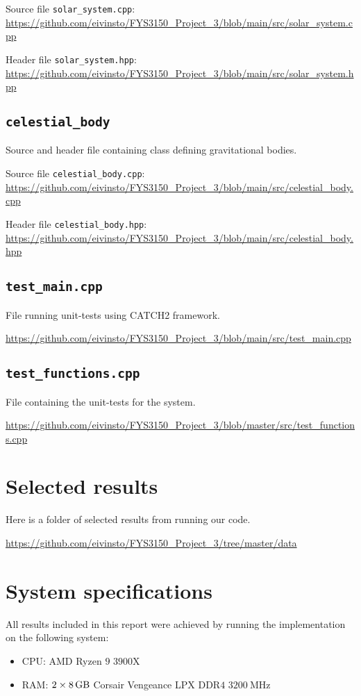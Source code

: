 \documentclass[reprint,english,notitlepage]{revtex4-1}  %
\begin{document}
Source file \verb+solar_system.cpp+:
\url{https://github.com/eivinsto/FYS3150_Project_3/blob/main/src/solar_system.cpp}

Header file \verb+solar_system.hpp+:
\url{https://github.com/eivinsto/FYS3150_Project_3/blob/main/src/solar_system.hpp}

\cprotect\subsection{\verb+celestial_body+} \label{A.5}
Source and header file containing class defining gravitational bodies.

Source file \verb+celestial_body.cpp+:
\url{https://github.com/eivinsto/FYS3150_Project_3/blob/main/src/celestial_body.cpp}

Header file \verb+celestial_body.hpp+:
\url{https://github.com/eivinsto/FYS3150_Project_3/blob/main/src/celestial_body.hpp}

\cprotect\subsection{\verb+test_main.cpp+} \label{A.6}
File running unit-tests using CATCH2 framework.

\url{https://github.com/eivinsto/FYS3150_Project_3/blob/main/src/test_main.cpp}

\cprotect\subsection{\verb+test_functions.cpp+} \label{A.7}
File containing the unit-tests for the system.

\url{https://github.com/eivinsto/FYS3150_Project_3/blob/master/src/test_functions.cpp}

\newpage
\section{Selected results} \label{B}
Here is a folder of selected results from running our code.

\url{https://github.com/eivinsto/FYS3150_Project_3/tree/master/data}

\newpage
\section{System specifications} \label{C}
All results included in this report were achieved by running the implementation on the following system:
\begin{itemize}
	\item CPU: AMD Ryzen \(9\) \(3900\)X
	\item RAM: \(2\times\SI{8}{\giga\byte}\) Corsair Vengeance LPX DDR\(4\) \(\SI{3200}{\mega\hertz}\)
\end{itemize}
\end{document}

